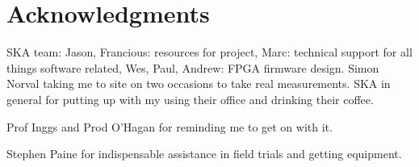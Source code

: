 \chapter{Acknowledgments}

SKA team: Jason, Francious: resources for project, Marc: technical support for all things software related, Wes, Paul, Andrew: FPGA firmware design. Simon Norval taking me to site on two occasions to take real measurements.
SKA in general for putting up with my using their office and drinking their coffee.

Prof Inggs and Prod O'Hagan for reminding me to get on with it.

Stephen Paine for indispensable assistance in field trials and getting equipment. 
